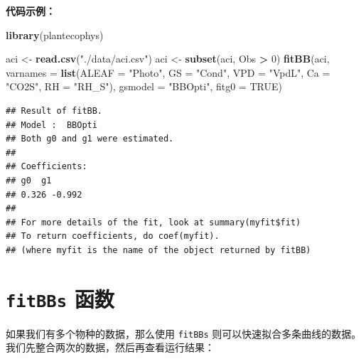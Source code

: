 \documentclass[
]{krantz}
\makeatletter
\newenvironment{Shaded}{\begin{snugshade}}{\end{snugshade}}
\newcommand{\DataTypeTok}[1]{\textcolor[rgb]{0.13,0.29,0.53}{#1}}
\newcommand{\DecValTok}[1]{\textcolor[rgb]{0.00,0.00,0.81}{#1}}
\newcommand{\KeywordTok}[1]{\textcolor[rgb]{0.13,0.29,0.53}{\textbf{#1}}}
\newcommand{\NormalTok}[1]{#1}
\newcommand{\OperatorTok}[1]{\textcolor[rgb]{0.81,0.36,0.00}{\textbf{#1}}}
\newcommand{\OtherTok}[1]{\textcolor[rgb]{0.56,0.35,0.01}{#1}}
\newcommand{\StringTok}[1]{\textcolor[rgb]{0.31,0.60,0.02}{#1}}
\newenvironment{kframe}{%
\medskip{}
\setlength{\fboxsep}{.8em}
 \def\at@end@of@kframe{}%
 \ifinner\ifhmode%
  \def\at@end@of@kframe{\end{minipage}}%
  \begin{minipage}{\columnwidth}%
 \fi\fi%
 \def\FrameCommand##1{\hskip\@totalleftmargin \hskip-\fboxsep
 \colorbox{shadecolor}{##1}\hskip-\fboxsep
     \hskip-\linewidth \hskip-\@totalleftmargin \hskip\columnwidth}%
 \MakeFramed {\advance\hsize-\width
   \@totalleftmargin\z@ \linewidth\hsize
   \@setminipage}}%
 {\par\unskip\endMakeFramed%
 \at@end@of@kframe}
\renewenvironment{Shaded}{\begin{kframe}}{\end{kframe}}
\makeatother
\begin{document}
\textbf{代码示例：}

\begin{Shaded}
\begin{Highlighting}[]
\KeywordTok{library}\NormalTok{(plantecophys)}

\NormalTok{aci <-}\StringTok{ }\KeywordTok{read.csv}\NormalTok{(}\StringTok{"./data/aci.csv"}\NormalTok{)}
\NormalTok{aci <-}\StringTok{ }\KeywordTok{subset}\NormalTok{(aci, Obs }\OperatorTok{>}\StringTok{ }\DecValTok{0}\NormalTok{)}
\KeywordTok{fitBB}\NormalTok{(aci, }\DataTypeTok{varnames =} \KeywordTok{list}\NormalTok{(}\DataTypeTok{ALEAF =} \StringTok{"Photo"}\NormalTok{, }\DataTypeTok{GS =} \StringTok{"Cond"}\NormalTok{, }\DataTypeTok{VPD =} \StringTok{"VpdL"}\NormalTok{,}
  \DataTypeTok{Ca =} \StringTok{"CO2S"}\NormalTok{, }\DataTypeTok{RH =} \StringTok{"RH_S"}\NormalTok{), }\DataTypeTok{gsmodel =} \StringTok{"BBOpti"}\NormalTok{, }\DataTypeTok{fitg0 =} \OtherTok{TRUE}\NormalTok{)}
\end{Highlighting}
\end{Shaded}

\begin{verbatim}
## Result of fitBB.
## Model :  BBOpti 
## Both g0 and g1 were estimated.
## 
## Coefficients:
## g0  g1
## 0.326 -0.992 
## 
## For more details of the fit, look at summary(myfit$fit)
## To return coefficients, do coef(myfit).
## (where myfit is the name of the object returned by fitBB)
\end{verbatim}

\hypertarget{fitbbs}{%
\section{\texorpdfstring{\texttt{fitBBs} 函数}{fitBBs 函数}}\label{fitbbs}}

如果我们有多个物种的数据，那么使用 \texttt{fitBBs} 则可以快速拟合多条曲线的数据。我们先整合两次的数据，然后再查看运行结果：
\end{document}
